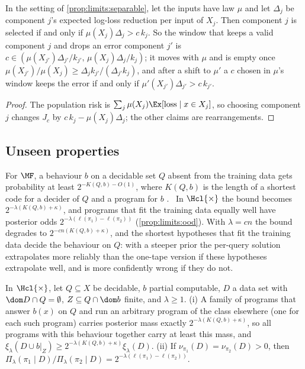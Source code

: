 \begin{proposition}\label{prop:limits:inputlaw}
In the setting of \cref{prop:limits:separable}, let the inputs have law $\mu$ and let $\Delta_j$ be component $j$'s expected log-loss reduction per input of $X_j$. Then component $j$ is selected if and only if $\mu(X_j)\Delta_j>c\,k_j$. So the window that keeps a valid component $j$ and drops an error component $j'$ is $c\in(\mu(X_{j'})\Delta_{j'}/k_{j'},\,\mu(X_j)\Delta_j/k_j)$; it moves with $\mu$ and is empty once $\mu(X_{j'})/\mu(X_j)\ge\Delta_jk_{j'}/(\Delta_{j'}k_j)$, and after a shift to $\mu'$ a $c$ chosen in $\mu$'s window keeps the error if and only if $\mu'(X_{j'})\Delta_{j'}>c\,k_{j'}$.
\end{proposition}

\begin{proof}
The population risk is $\sum_j\mu(X_j)\Ex[\text{loss}\mid x\in X_j]$, so choosing component $j$ changes $J_c$ by $c\,k_j-\mu(X_j)\Delta_j$; the other claims are rearrangements.
\end{proof}

\subsection{Unseen properties}\label{app:limits:ood}\label{sec:limits:ood}

For $\MF$, a behaviour $b$ on a decidable set $Q$ absent from the training data gets probability at least $2^{-K(Q,b)-O(1)}$, where $K(Q,b)$ is the length of a shortest code for a decider of $Q$ and a program for $b$ \citep[Proposition~8.1]{claudeSFI2026fundamentals}.%
\ In $\Hcl{\times}$ the bound becomes $2^{-\lambda(K(Q,b)+\kappa)}$, and programs that fit the training data equally well have posterior odds $2^{-\lambda(\ell(\pi_1)-\ell(\pi_2))}$ (\cref{prop:limits:ood}). With $\lambda=cn$ the bound degrades to $2^{-cn(K(Q,b)+\kappa)}$, and the shortest hypotheses that fit the training data decide the behaviour on $Q$: with a steeper prior the per-query solution extrapolates more reliably than the one-tape version if these hypotheses extrapolate well, and is more confidently wrong if they do not.

\begin{proposition}\label{prop:limits:ood}
In $\Hcl{\times}$, let $Q\subseteq X$ be decidable, $b$ partial computable, $D$ a data set with $\dom D\cap Q=\emptyset$, $Z\subseteq Q\cap\dom b$ finite, and $\lambda\ge1$. (i) A family of programs that answer $b(x)$ on $Q$ and run an arbitrary program of the class elsewhere (one for each such program) carries posterior mass exactly $2^{-\lambda(K(Q,b)+\kappa)}$, so all programs with this behaviour together carry at least this mass, and $\xi_\lambda(D\cup b|_Z)\ge2^{-\lambda(K(Q,b)+\kappa)}\xi_\lambda(D)$. (ii) If $\nu_{\pi_1}(D)=\nu_{\pi_2}(D)>0$, then $\Pi_\lambda(\pi_1\mid D)/\Pi_\lambda(\pi_2\mid D)=2^{-\lambda(\ell(\pi_1)-\ell(\pi_2))}$.
\end{proposition}

